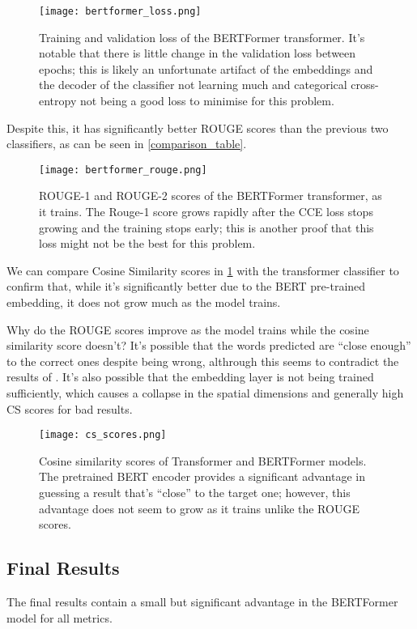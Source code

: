 \begin{figure}[h]
	\texttt{[image: bertformer\_loss.png]}
	\caption{Training and validation loss of the BERTFormer transformer. It's notable that there is little change in the validation loss between epochs; this is likely an unfortunate artifact of the embeddings and the decoder of the classifier not learning much and categorical cross-entropy not being a good loss to minimise for this problem.}
\end{figure}

Despite this, it has significantly better ROUGE scores than the previous two classifiers, as can be seen in \cref{comparison_table}.

\begin{figure}[h]
	\texttt{[image: bertformer\_rouge.png]}
	\caption{ROUGE-1 and ROUGE-2 scores of the BERTFormer transformer, as it trains. The Rouge-1 score grows rapidly after the CCE loss stops growing and the training stops early; this is another proof that this loss might not be the best for this problem.}
\end{figure}

We can compare Cosine Similarity scores in \cref{cs_scores} with the transformer classifier to confirm that, while it's significantly better due to the BERT pre-trained embedding, it does not grow much as the model trains.

Why do the ROUGE scores improve as the model trains while the cosine similarity score doesn't? It's possible that the words predicted are ``close enough'' to the correct ones despite being wrong, althrough this seems to contradict the results of \appendixA{}. It's also possible that the embedding layer is not being trained sufficiently, which causes a collapse in the spatial dimensions and generally high CS scores for bad results.

\begin{figure}[h]
	\texttt{[image: cs\_scores.png]}
	\caption{Cosine similarity scores of Transformer and BERTFormer models. The pretrained BERT encoder provides a significant advantage in guessing a result that's ``close'' to the target one; however, this advantage does not seem to grow as it trains unlike the ROUGE scores.}
	\label{cs_scores}
\end{figure}

\newpage{}
\subsection{Final Results}
The final results contain a small but significant advantage in the BERTFormer model for all metrics.

